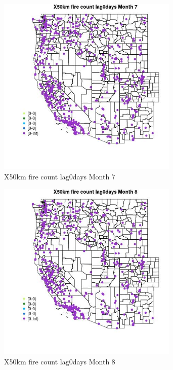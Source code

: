 \begin{figure} 
\centering  
\includegraphics[width=0.77\textwidth]{Code_Outputs/Report_ML_input_PM25_Step4_part_e_de_duplicated_aves_compiled_2019-05-14wNAs_MapObsMo7X50km_fire_count_lag0days.jpg} 
\caption{\label{fig:Report_ML_input_PM25_Step4_part_e_de_duplicated_aves_compiled_2019-05-14wNAsMapObsMo7X50km_fire_count_lag0days}X50km fire count lag0days Month 7} 
\end{figure} 
 

\begin{figure} 
\centering  
\includegraphics[width=0.77\textwidth]{Code_Outputs/Report_ML_input_PM25_Step4_part_e_de_duplicated_aves_compiled_2019-05-14wNAs_MapObsMo8X50km_fire_count_lag0days.jpg} 
\caption{\label{fig:Report_ML_input_PM25_Step4_part_e_de_duplicated_aves_compiled_2019-05-14wNAsMapObsMo8X50km_fire_count_lag0days}X50km fire count lag0days Month 8} 
\end{figure} 
 

